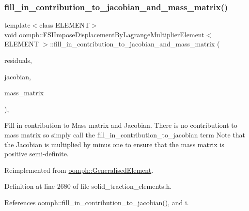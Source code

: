 \subsubsection{\texorpdfstring{fill\+\_\+in\+\_\+contribution\+\_\+to\+\_\+jacobian\+\_\+and\+\_\+mass\+\_\+matrix()}{fill\_in\_contribution\_to\_jacobian\_and\_mass\_matrix()}}
{\footnotesize\ttfamily template$<$class E\+L\+E\+M\+E\+NT$>$ \\
void \hyperlink{classoomph_1_1FSIImposeDisplacementByLagrangeMultiplierElement}{oomph\+::\+F\+S\+I\+Impose\+Displacement\+By\+Lagrange\+Multiplier\+Element}$<$ E\+L\+E\+M\+E\+NT $>$\+::fill\+\_\+in\+\_\+contribution\+\_\+to\+\_\+jacobian\+\_\+and\+\_\+mass\+\_\+matrix (\begin{DoxyParamCaption}\item[{\hyperlink{classoomph_1_1Vector}{Vector}$<$ double $>$ \&}]{residuals,  }\item[{\hyperlink{classoomph_1_1DenseMatrix}{Dense\+Matrix}$<$ double $>$ \&}]{jacobian,  }\item[{\hyperlink{classoomph_1_1DenseMatrix}{Dense\+Matrix}$<$ double $>$ \&}]{mass\+\_\+matrix }\end{DoxyParamCaption})\hspace{0.3cm}{\ttfamily [inline]}, {\ttfamily [virtual]}}



Fill in contribution to Mass matrix and Jacobian. There is no contributiont to mass matrix so simply call the fill\+\_\+in\+\_\+contribution\+\_\+to\+\_\+jacobian term Note that the Jacobian is multiplied by minus one to ensure that the mass matrix is positive semi-\/definite. 



Reimplemented from \hyperlink{classoomph_1_1GeneralisedElement_a2b6294a730647cf865da94f2531466f8}{oomph\+::\+Generalised\+Element}.



Definition at line 2680 of file solid\+\_\+traction\+\_\+elements.\+h.



References oomph\+::fill\+\_\+in\+\_\+contribution\+\_\+to\+\_\+jacobian(), and i.

\mbox{\label{classoomph_1_1FSIImposeDisplacementByLagrangeMultiplierElement_aadea4a492cc464dae2c77617a706a98d}} 
